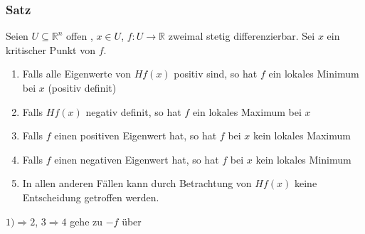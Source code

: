 \subsubsection{Satz} %
\label{ssub:satz}
Seien $ U \subseteq \mathbb{R}^n$ offen , $ x \in U $, $ f: U \to \mathbb{R} $ zweimal stetig differenzierbar. Sei $x$ ein kritischer Punkt von $f$.
\begin{enumerate}
	\item Falls alle Eigenwerte von $Hf(x)$ positiv sind, so hat $f$ ein lokales Minimum bei $x$ (positiv definit)
	\item Falls $Hf(x)$ negativ definit, so hat $f$ ein lokales Maximum bei $x$
	\item Falls $f$ einen positiven Eigenwert hat, so hat $f$ bei $x$ kein lokales Maximum	
	\item Falls $f$ einen negativen Eigenwert hat, so hat $f$ bei $x$ kein lokales Minimum
	\item In allen anderen Fällen kann durch Betrachtung von $Hf(x)$ keine Entscheidung getroffen werden.
\end{enumerate}
$1) \Rightarrow 2$, $3 \Rightarrow 4$ gehe zu $-f$ über
